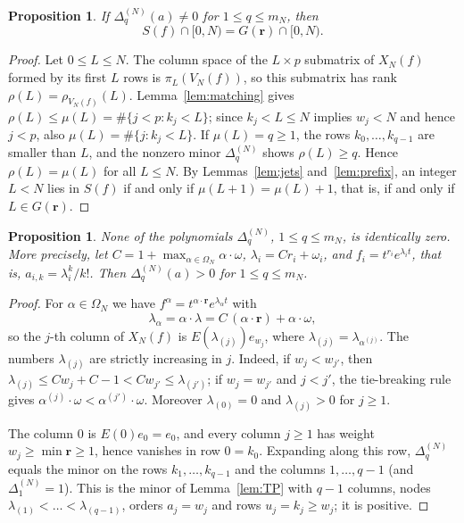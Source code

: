 \documentclass{amsart}
\newtheorem{proposition}[theorem]{Proposition}
\theoremstyle{definition}
\numberwithin{equation}{section}
\newcommand{\bfr}{\mathbf{r}}
\begin{document}
\begin{proposition}\label{prop:jetvalues}
If $\Delta^{(N)}_q(a)\ne0$ for $1\le q\le m_N$, then
\[
  S(f)\cap[0,N)=G(\bfr)\cap[0,N).
\]
\end{proposition}

\begin{proof}
Let $0\le L\le N$. The column space of the $L\times p$ submatrix of $X_N(f)$
formed by its first $L$ rows is $\pi_L(V_N(f))$, so this submatrix has rank
$\rho(L)=\rho_{V_N(f)}(L)$. Lemma~\ref{lem:matching} gives
$\rho(L)\le\mu(L)=\#\{j<p:k_j<L\}$; since $k_j<L\le N$ implies $w_j<N$ and
hence $j<p$, also $\mu(L)=\#\{j:k_j<L\}$. If $\mu(L)=q\ge1$, the rows
$k_0,\dots,k_{q-1}$ are smaller than $L$, and the nonzero minor
$\Delta^{(N)}_q$ shows $\rho(L)\ge q$. Hence $\rho(L)=\mu(L)$ for all $L\le N$.
By Lemmas~\ref{lem:jets} and~\ref{lem:prefix}, an integer $L<N$ lies in $S(f)$
if and only if $\mu(L+1)=\mu(L)+1$, that is, if and only if $L\in G(\bfr)$.
\end{proof}

\begin{proposition}\label{prop:witness}
None of the polynomials $\Delta^{(N)}_q$, $1\le q\le m_N$, is identically zero.
More precisely, let $C=1+\max_{\alpha\in\Omega_N}\alpha\cdot\omega$,
$\lambda_i=Cr_i+\omega_i$, and $f_i=t^{r_i}e^{\lambda_it}$, that is,
$a_{i,k}=\lambda_i^k/k!$. Then $\Delta^{(N)}_q(a)>0$ for $1\le q\le m_N$.
\end{proposition}

\begin{proof}
For $\alpha\in\Omega_N$ we have $f^\alpha=t^{\alpha\cdot\bfr}e^{\lambda_\alpha t}$
with
\[
  \lambda_\alpha=\alpha\cdot\lambda=C\,(\alpha\cdot\bfr)+\alpha\cdot\omega,
\]
so the $j$-th column of $X_N(f)$ is $E(\lambda_{(j)})e_{w_j}$, where
$\lambda_{(j)}=\lambda_{\alpha^{(j)}}$. The numbers $\lambda_{(j)}$ are strictly
increasing in $j$. Indeed, if $w_j<w_{j'}$, then
$\lambda_{(j)}\le Cw_j+C-1<Cw_{j'}\le\lambda_{(j')}$; if $w_j=w_{j'}$ and
$j<j'$, the tie-breaking rule gives
$\alpha^{(j)}\cdot\omega<\alpha^{(j')}\cdot\omega$. Moreover
$\lambda_{(0)}=0$ and $\lambda_{(j)}>0$ for $j\ge1$.

The column $0$ is $E(0)e_0=e_0$, and every column $j\ge1$ has weight
$w_j\ge\min\bfr\ge1$, hence vanishes in row $0=k_0$. Expanding along this row,
$\Delta^{(N)}_q$ equals the minor on the rows $k_1,\dots,k_{q-1}$ and the
columns $1,\dots,q-1$ (and $\Delta^{(N)}_1=1$). This is the minor of
Lemma~\ref{lem:TP} with $q-1$ columns, nodes
$\lambda_{(1)}<\dots<\lambda_{(q-1)}$,
orders $a_j=w_j$ and rows $u_j=k_j\ge w_j$; it is positive.
\end{proof}
\end{document}
